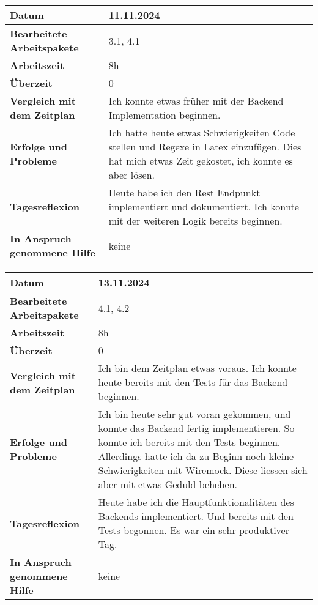 \begin{longtable}{p{}|p{}}
	\hline
	\textbf{Datum}                       & 11.11.2024 \\
	\hline
	\textbf{Bearbeitete Arbeitspakete}   & 3.1, 4.1 \\
	\hline
	\textbf{Arbeitszeit}                 & 8h \\
	\hline
	\textbf{Überzeit}                    & 0 \\
	\hline
	\textbf{Vergleich mit dem Zeitplan}  & Ich konnte etwas früher mit der Backend Implementation beginnen.  \\
	\hline
	\textbf{Erfolge und Probleme}        & Ich hatte heute etwas Schwierigkeiten Code stellen und Regexe in Latex einzufügen. Dies hat mich etwas Zeit gekostet, ich konnte es aber lösen.
	\\
	\hline
	\textbf{Tagesreflexion}              & Heute habe ich den Rest Endpunkt implementiert und dokumentiert. Ich konnte mit der weiteren Logik bereits beginnen. 
	\\
	\hline
	\textbf{In Anspruch genommene Hilfe} & keine \\
	\hline
\end{longtable}\label{tab:arbeitsprotokoll-tag4}
\newpage

\begin{longtable}{p{}|p{}}
	\hline
	\textbf{Datum}                       & 13.11.2024 \\
	\hline
	\textbf{Bearbeitete Arbeitspakete}   & 4.1, 4.2 \\
	\hline
	\textbf{Arbeitszeit}                 & 8h \\
	\hline
	\textbf{Überzeit}                    & 0 \\
	\hline
	\textbf{Vergleich mit dem Zeitplan}  & Ich bin dem Zeitplan etwas voraus. Ich konnte heute bereits mit den Tests für das Backend beginnen.\\
	\hline
	\textbf{Erfolge und Probleme}        & Ich bin heute sehr gut voran gekommen, und konnte das Backend fertig implementieren. So konnte ich bereits mit den Tests beginnen. Allerdings hatte ich da zu Beginn noch kleine Schwierigkeiten mit Wiremock. Diese liessen sich aber mit etwas Geduld beheben.
	\\
	\hline
	\textbf{Tagesreflexion}              & Heute habe ich die Hauptfunktionalitäten des Backends implementiert. Und bereits mit den Tests begonnen. Es war ein sehr produktiver Tag.
	\\
	\hline
	\textbf{In Anspruch genommene Hilfe} & keine \\
	\hline
\end{longtable}\label{tab:arbeitsprotokoll-tag5}
\newpage

